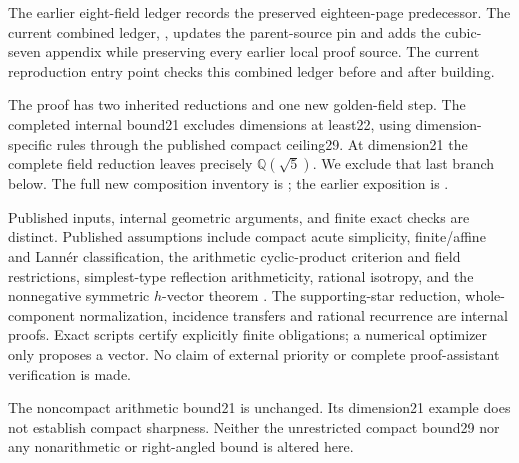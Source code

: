 \documentclass[11pt]{article}
\newcommand{\Q}{\mathbb Q}
\begin{document}
The earlier eight-field ledger records the preserved eighteen-page
predecessor. The current combined ledger,
,
updates the parent-source pin and adds the cubic-seven appendix while
preserving every earlier local proof source. The current reproduction
entry point checks this combined ledger before and after building.

The proof has two inherited reductions and one new golden-field step.
The completed internal bound21 excludes dimensions at least22, using
dimension-specific rules through the published compact ceiling29. At
dimension21 the complete field reduction leaves precisely $\Q(\sqrt5)$.
We exclude that last branch below. The full new composition inventory is
; the
earlier exposition is .

Published inputs, internal geometric arguments, and finite exact checks
are distinct. Published assumptions include compact acute simplicity,
finite/affine and Lann\'er classification, the arithmetic cyclic-product
criterion and field restrictions, simplest-type reflection arithmeticity,
rational isotropy, and the nonnegative symmetric $h$-vector theorem
\cite{Vinberg,Nikulin,Belolipetsky}.
The supporting-star reduction, whole-component normalization, incidence
transfers and rational recurrence are internal proofs. Exact scripts
certify explicitly finite obligations; a numerical optimizer only
proposes a vector. No claim of external priority or complete proof-assistant
verification is made.

The noncompact arithmetic bound21 is unchanged. Its dimension21 example
does not establish compact sharpness. Neither the unrestricted compact
bound29 nor any nonarithmetic or right-angled bound is altered here.
\end{document}
